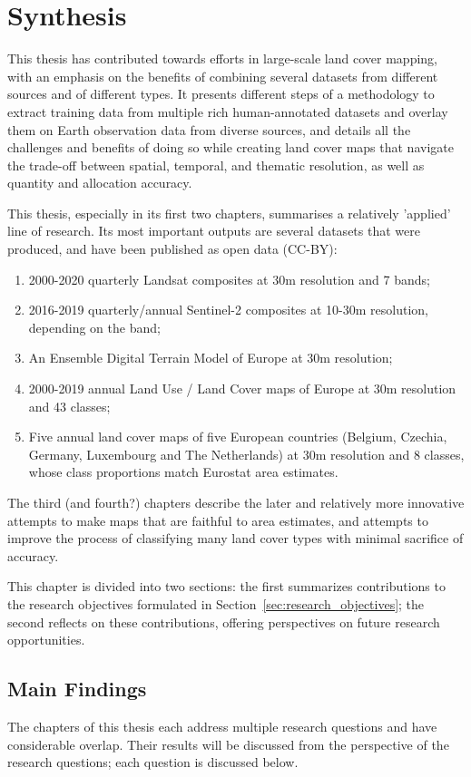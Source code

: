 \chapter[Synthesis]{Synthesis}
\label{cha:Chapter6}
\newpage

This thesis has contributed towards efforts in large-scale land cover mapping, with an emphasis on the benefits of combining several datasets from different sources and of different types.  It presents different steps of a methodology to extract training data from multiple rich human-annotated datasets and overlay them on Earth observation data from diverse sources, and details all the challenges and benefits of doing so while creating land cover maps that navigate the trade-off between spatial, temporal, and thematic resolution, as well as quantity and allocation accuracy.

This thesis, especially in its first two chapters, summarises a relatively 'applied' line of research. Its most important outputs are several datasets that were produced, and have been published as open data (CC-BY):
\begin{enumerate}
    \item 2000-2020 quarterly Landsat composites at 30m resolution and 7 bands;
    \item 2016-2019 quarterly/annual Sentinel-2 composites at 10-30m resolution, depending on the band;
    \item An Ensemble Digital Terrain Model of Europe at 30m resolution;
    \item 2000-2019 annual Land Use / Land Cover maps of Europe at 30m resolution and 43 classes;
    \item Five annual land cover maps of five European countries (Belgium, Czechia, Germany, Luxembourg and The Netherlands) at 30m resolution and 8 classes, whose class proportions match Eurostat area estimates.
\end{enumerate}
The third (and fourth?) chapters describe the later and relatively more innovative attempts to make maps that are faithful to area estimates, and attempts to improve the process of classifying many land cover types with minimal sacrifice of accuracy.

This chapter is divided into two sections: the first summarizes contributions to the research objectives formulated in Section~\ref{sec:research_objectives}; the second reflects on these contributions, offering perspectives on future research opportunities. 

\section{Main Findings}
    The chapters of this thesis each address multiple research questions and have considerable overlap. Their results will be discussed from the perspective of the research questions; each question is discussed below.
    
